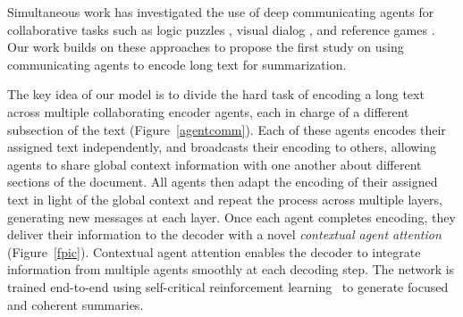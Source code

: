 \documentclass[11pt,a4paper]{article}
\newcommand{\yejin}[1]{{\color{cyan}yc:[#1]}}
\begin{document}
\begin{figure*}[t!]
\begin{center} 
\end{center} 
\vskip -0.25in
\caption{Multi-agent-encoder-decoder overview. Each agent $a$ encodes a paragraph using a local encoder followed by multiple contextual layers with agent communication through concentrated messages $z_a^{(k)}$ at each layer $k$. \textbf{Communication is illustrated in Figure~\ref{fpicmessagepassing}}.
The word context vectors $c^t_a$ are condensed into agent context $c_t^*$. Agent specific generation probabilities, \textit{p}$_a^t$, enable voting for the suitable out-of-vocabulary words (e.g., '\textit{yen}') in the final distribution.}
\label{fpic}
\end{figure*}

Simultaneous work has investigated the use of deep communicating agents \cite{commnet} for collaborative tasks such as logic puzzles \cite{multiagent4}, visual dialog \cite{visualdialog}, and reference games \cite{multiagent2}. Our work builds on these approaches to propose the first study on using communicating agents to encode long text for summarization.





The key idea of our model is to divide the hard task of encoding a long text across multiple collaborating encoder agents, each in charge of a different subsection of the text (Figure~\ref{agentcomm}).
Each of these agents encodes their assigned text independently, and broadcasts their encoding to others, allowing agents to share global context information with one another about different sections of the document. All agents then adapt the encoding of their assigned text in light of the global context and repeat the process across multiple layers, generating new messages at each layer.
Once each agent completes encoding, they deliver their information to the decoder with a novel \textit{contextual agent attention} (Figure~\ref{fpic}). Contextual agent attention enables the decoder to integrate information from multiple agents smoothly at each decoding step.  
The network is trained end-to-end using
self-critical reinforcement learning~\cite{scic} to generate focused and coherent summaries. 
\begin{comment}
\yejin{``orchestrate'' is a high agency word, and some NLP reviewers seem to have almost an allergic reaction to overly animated NNs...}
\end{comment} 
\end{document}
